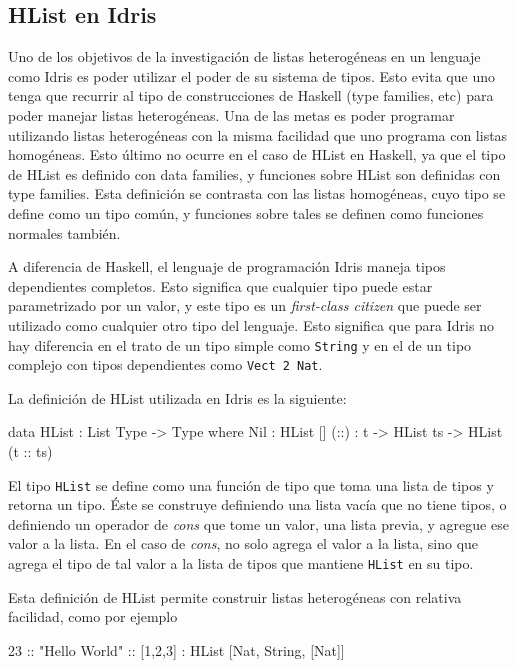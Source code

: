 \subsection{HList en Idris}

Uno de los objetivos de la investigación de listas heterogéneas en un lenguaje como Idris es poder utilizar el poder de su sistema de tipos. Esto evita que uno tenga que recurrir al tipo de construcciones de Haskell (type families, etc) para poder manejar listas heterogéneas. Una de las metas es poder programar utilizando listas heterogéneas con la misma facilidad que uno programa con listas homogéneas.
Esto último no ocurre en el caso de HList en Haskell, ya que el tipo de HList es definido con data families, y funciones sobre HList son definidas con type families. Esta definición se contrasta con las listas homogéneas, cuyo tipo se define como un tipo común, y funciones sobre tales se definen como funciones normales también.

A diferencia de Haskell, el lenguaje de programación Idris maneja tipos dependientes completos. Esto significa que cualquier tipo puede estar parametrizado por un valor, y este tipo es un \textit{first-class citizen} que puede ser utilizado como cualquier otro tipo del lenguaje. Esto significa que para Idris no hay diferencia en el trato de un tipo simple como \texttt{String} y en el de un tipo complejo con tipos dependientes como \texttt{Vect 2 Nat}.

La definición de HList utilizada en Idris es la siguiente:

\begin{code}
data HList : List Type -> Type where
  Nil : HList []
  (::) : t -> HList ts -> HList (t :: ts)
\end{code}

El tipo \texttt{HList} se define como una función de tipo que toma una lista de tipos y retorna un tipo. Éste se construye definiendo una lista vacía que no tiene tipos, o definiendo un operador de \textit{cons} que tome un valor, una lista previa, y agregue ese valor a la lista. En el caso de \textit{cons}, no solo agrega el valor a la lista, sino que agrega el tipo de tal valor a la lista de tipos que mantiene \texttt{HList} en su tipo.

Esta definición de HList permite construir listas heterogéneas con relativa facilidad, como por ejemplo 

\begin{code}
23 :: "Hello World" :: [1,2,3] :
    HList [Nat, String, [Nat]]
\end{code}


